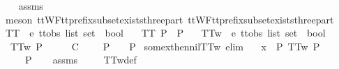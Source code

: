 %
\isadelimproof
\ \ %
\endisadelimproof
%
\isatagproof
{}\isamarkupfalse%
\ assms\isanewline
\ \ \isamarkupfalse%
\ {\isacharparenleft}meson\ ttWF{\isacharunderscore}tt{\isacharunderscore}prefix{\isacharunderscore}subset{\isacharunderscore}exists{\isacharunderscore}three{\isacharunderscore}part\ ttWF{\isacharunderscore}tt{\isacharunderscore}prefix{\isacharunderscore}subset{\isacharunderscore}exists{\isacharunderscore}three{\isacharunderscore}part{\isacharprime}{\isacharparenright}%
\endisatagproof
{\isafoldproof}%
%
\isadelimproof
%
\endisadelimproof
%
\isadelimdocument
%
\endisadelimdocument
%
\isatagdocument
%
\isamarkuptrue%
%
\endisatagdocument
{\isafolddocument}%
%
\isadelimdocument
%
\endisadelimdocument
{}\isamarkupfalse%
\ TT{}\ {\isacharcolon}{\isacharcolon}\ {\isachardoublequoteopen}{\isacharprime}e\ ttobs\ list\ set\ {\isasymRightarrow}\ bool{\isachardoublequoteclose}\ \isanewline
\ \ {\isachardoublequoteopen}TT{}\ P\ {\isacharequal}\ {\isacharparenleft}P\ {\isasymnoteq}\ {\isacharbraceleft}{\isacharbraceright}{\isacharparenright}{\isachardoublequoteclose}\isanewline
\isanewline
{}\isamarkupfalse%
\ TT{}w\ {\isacharcolon}{\isacharcolon}\ {\isachardoublequoteopen}{\isacharprime}e\ ttobs\ list\ set\ {\isasymRightarrow}\ bool{\isachardoublequoteclose}\ \isanewline
\ \ {\isachardoublequoteopen}TT{}w\ P\ {\isacharequal}\ {\isacharparenleft}{\isasymforall}\ {\isasymrho}\ {\isasymsigma}{\isachardot}\ {\isacharparenleft}{\isasymrho}\ {\isasymle}\isactrlsub C\ {\isasymsigma}\ {\isasymand}\ {\isasymsigma}\ {\isasymin}\ P{\isacharparenright}\ {\isasymlongrightarrow}\ {\isasymrho}\ {\isasymin}\ P{\isacharparenright}{\isachardoublequoteclose}\isanewline
\isanewline
{}\isamarkupfalse%
\ some{\isacharunderscore}x{\isacharunderscore}then{\isacharunderscore}nil{\isacharunderscore}TT{}w\ {\isacharbrackleft}elim{\isacharbrackright}{\isacharcolon}\isanewline
\ \ \ {\isachardoublequoteopen}x\ {\isasymin}\ P{\isachardoublequoteclose}\ {\isachardoublequoteopen}TT{}w\ P{\isachardoublequoteclose}\isanewline
\ \ \ {\isachardoublequoteopen}{\isacharbrackleft}{\isacharbrackright}\ {\isasymin}\ P{\isachardoublequoteclose}\isanewline
%
\isadelimproof
\ \ %
\endisadelimproof
%
\isatagproof
{}\isamarkupfalse%
\ assms\ \isanewline
\ \ \isamarkupfalse%
\ TT{}w{\isacharunderscore}def\ \isamarkupfalse%
